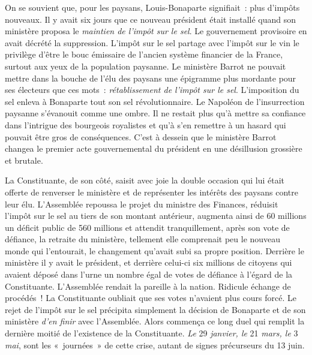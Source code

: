 \documentclass[twoside]{book} %
\begin{document}
On se souvient que, pour les paysans, Louis-Bonaparte signifiait : plus d’impôts nouveaux. Il y avait six jours que ce nouveau président était installé quand son ministère proposa le \emph{maintien de l’impôt sur le sel}. Le gouvernement provisoire en avait décrété la suppression. L’impôt sur le sel partage avec l’impôt sur le vin le privilège d’être le bouc émissaire de l’ancien système financier de la France, surtout aux yeux de la population paysanne. Le ministère Barrot ne pouvait mettre dans la bouche de l’élu des paysans une épigramme plus mordante pour ses électeurs que ces mots : \emph{rétablissement de l’impôt sur le sel}. L’imposition du sel enleva à Bonaparte tout son sel révolutionnaire. Le Napoléon de l’insurrection paysanne s’évanouit comme une ombre. Il ne restait plus qu’à mettre sa confiance dans l’intrigue des bourgeois royalistes et qu’à s’en remettre à un hasard qui pouvait être gros de conséquences. C’est à dessein que le ministère Barrot changea le premier acte gouvernemental du président en une désillusion grossière et brutale.\par
La Constituante, de son côté, saisit avec joie la double occasion qui lui était offerte de renverser le ministère et de représenter les intérêts des paysans contre leur élu. L’Assemblée repoussa le projet du ministre des Finances, réduisit l’impôt sur le sel au tiers de son montant antérieur, augmenta ainsi de 60 millions un déficit public de 560 millions et attendit tranquillement, après son vote de défiance, la retraite du ministère, tellement elle comprenait peu le nouveau monde qui l’entourait, le changement qu’avait subi sa propre position. Derrière le ministère il y avait le président, et derrière celui-ci six millions de citoyens qui avaient déposé dans l’urne un nombre égal de votes de défiance à l’égard de la Constituante. L’Assemblée rendait la pareille à la nation. Ridicule échange de procédés ! La Constituante oubliait que ses votes n’avaient plus cours forcé. Le rejet de l’impôt sur le sel précipita simplement la décision de Bonaparte et de son ministère \emph{d’en finir} avec l’Assemblée. Alors commença ce long duel qui remplit la dernière moitié de l’existence de la Constituante. \emph{Le} 29 \emph{janvier, le} 21 \emph{mars, le} 3 \emph{mai}, sont les « journées » de cette crise, autant de signes précurseurs du 13 juin.\par
\end{document}
